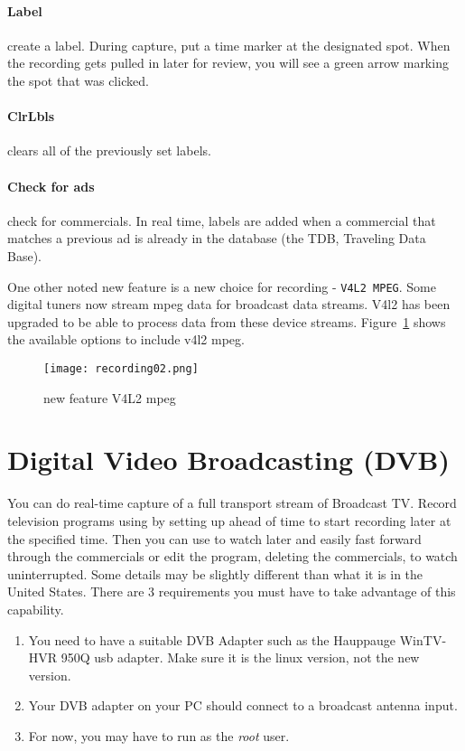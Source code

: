 \paragraph{Label} create a label.  During capture, put a time marker at the designated spot.  When the recording 
gets pulled in later for review, you will see a green arrow marking the spot that was clicked.
\paragraph{ClrLbls} clears all of the previously set labels.
\paragraph{Check for ads} check for commercials.  In real time, labels are added when a commercial that matches
a previous ad is already in the database (the TDB, Traveling Data Base).

One other noted new feature is a new choice for recording -  \texttt{V4L2 MPEG}.  Some digital tuners now stream mpeg data for broadcast data streams.  V4l2 has been upgraded to be able to process data from these device streams.  Figure~\ref{fig:recording02} shows the available options to include v4l2 mpeg.

\begin{figure}[htpb]
    \centering
    \texttt{[image: recording02.png]}
    \caption{new feature V4L2 mpeg}
    \label{fig:recording02}
\end{figure}

\section{Digital Video Broadcasting (DVB)}%
\label{sec:digital_video_broadcasting}

You can do real-time capture of a full transport stream of Broadcast TV.  Record television programs using \CGG{} by setting up ahead of time to start recording later at the specified time.  Then you can use \CGG{} to watch later and easily fast forward through the commercials or edit the program, deleting the commercials, to watch uninterrupted.  Some details may be slightly different than what it is in the United States.  There are 3 requirements you must have to take advantage of this capability.

\begin{enumerate}
    \item You need to have a suitable DVB Adapter such as the Hauppauge WinTV-HVR 950Q usb adapter. Make sure it is the linux version, not the new version.
    \item Your DVB adapter on your PC should connect to a broadcast antenna input.
    \item For now, you may have to run as the \textit{root} user.
\end{enumerate}

